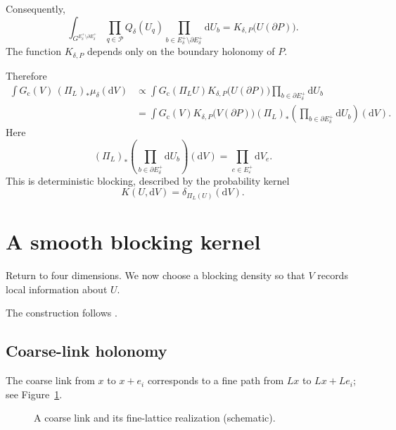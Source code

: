 \documentclass[10pt,reqno]{amsart}
\theoremstyle{definition}
\theoremstyle{remark}
\numberwithin{equation}{section}
\numberwithin{figure}{section}
\newcommand{\dd}{\mathrm d}
\newcommand{\e}{\varepsilon}
\newcommand{\Gc}{G_{\mathrm c}}
\begin{document}
Consequently,
\begin{equation}\label{eq:display-047}
\int_{G^{E_\delta^+\setminus\partial E_\delta^+}}
\prod_{q\in\mathcal P}Q_\delta(U_q)
\prod_{b\in E_\delta^+\setminus\partial E_\delta^+}\dd U_b
=K_{\delta,P}\bigl(U(\partial P)\bigr).
\end{equation}
The function $K_{\delta,P}$ depends only on the boundary holonomy of $P$.

Therefore
\begin{equation}\label{eq:display-048}
\begin{aligned}
\int\Gc(V)\,(\Pi_L)_*\mu_\delta(\dd V)
&\propto\int\Gc(\Pi_LU)K_{\delta,P}\bigl(U(\partial P)\bigr)
\prod_{b\in\partial E_\delta^+}\dd U_b\\
&=\int\Gc(V)K_{\delta,P}\bigl(V(\partial P)\bigr)
(\Pi_L)_*\left(\prod_{b\in\partial E_\delta^+}\dd U_b\right)(\dd V).
\end{aligned}
\end{equation}
Here
\begin{equation}\label{eq:display-049}
(\Pi_L)_*\left(\prod_{b\in\partial E_\delta^+}\dd U_b\right)(\dd V)
=\prod_{e\in E_\e^+}\dd V_e.
\end{equation}
This is deterministic blocking, described by the probability kernel
\begin{equation}\label{eq:display-050}
K(U,\dd V)=\delta_{\Pi_L(U)}(\dd V).
\end{equation}

\section{A smooth blocking kernel}
Return to four dimensions. We now choose a blocking density so that $V$ records local information about $U$.

The construction follows \cite[Section~11, (11.1)--(11.2)]{Exposition}.\par\smallskip

\subsection{Coarse-link holonomy}

The coarse link from $x$ to $x+e_i$ corresponds to a fine path from $Lx$ to $Lx+Le_i$; see Figure~\ref{fig:coarse-link}.

\begin{figure}[htbp]
\centering
{}
\caption{A coarse link and its fine-lattice realization (schematic).}
\label{fig:coarse-link}
\end{figure}
\end{document}
